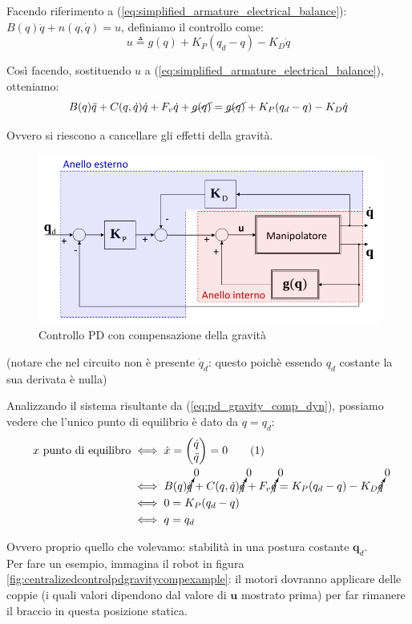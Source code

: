 Facendo riferimento a (\ref{eq:simplified_armature_electrical_balance}): $B(q)\ddot{q} + n(q, \dot{q}) = u$, definiamo il controllo come:
\boldmath
$$
u \triangleq g(q) + K_P(q_d - q) - K_D\dot{q}
$$

Così facendo, sostituendo $u$ a (\ref{eq:simplified_armature_electrical_balance}), otteniamo:
\begin{equation}\label{eq:pd_gravity_comp_dyn}
B(q)\ddot{q} + C(q, \dot{q})\dot{q} + F_v\dot{q} + \cancel{g(q)} = \cancel{g(q)} + K_P(q_d - q) - K_D\dot{q}
\end{equation}

Ovvero si riescono a cancellare gli effetti della gravità.

\begin{figure}[H]
	\centering
	\includegraphics[width=0.6\linewidth]{images/centralized_control_pd_gravity_comp}
	\caption{Controllo PD con compensazione della gravità}
	\label{fig:centralizedcontrolpdgravitycomp}
\end{figure}
(notare che nel circuito non è presente $\dot{q}_d$: questo poichè essendo $q_d$ costante la sua derivata è nulla)

Analizzando il sistema risultante da (\ref{eq:pd_gravity_comp_dyn}), possiamo vedere che l'unico punto di equilibrio è dato da $q = q_d$:
\unboldmath
\begin{align*}
x \ \text{punto di equilibro} 
&\iff 
\dot{x} = \begin{pmatrix}\dot{q} \\ \ddot{q}\end{pmatrix} = 0
\stepcounter{equation}\tag{\theequation}\label{eq:pd_grav_comp_equil} \\
&\iff 
B(q)\cancelto{0}{\ddot{q}} + C(q, \dot{q})\cancelto{0}{\dot{q}} + F_v\cancelto{0}{\dot{q}} = K_P(q_d - q) - K_D\cancelto{0}{\dot{q}} \\
&\iff
0 = K_P(q_d - q) \\
&\iff
q = q_d
\end{align*}

Ovvero proprio quello che volevamo: stabilità in una postura costante $\mathbf{q}_d$.\\
Per fare un esempio, immagina il robot in figura \ref{fig:centralizedcontrolpdgravitycompexample}: il motori dovranno applicare delle coppie (i quali valori dipendono dal valore di $\mathbf{u}$ mostrato prima) per far rimanere il braccio in questa posizione statica.

